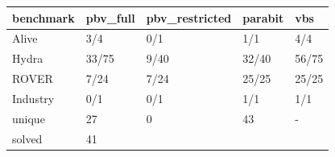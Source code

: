 \begin{tabular}{lllll}
\toprule
benchmark & pbv_full & pbv_restricted & parabit & vbs \\
\midrule
Alive & 3/4 & 0/1 & 1/1 & 4/4 \\
Hydra & 33/75 & 9/40 & 32/40 & 56/75 \\
ROVER & 7/24 & 7/24 & 25/25 & 25/25 \\
Industry & 0/1 & 0/1 & 1/1 & 1/1 \\
unique & 27 & 0 & 43 & - \\
solved & 41%
\bottomrule
\end{tabular}
